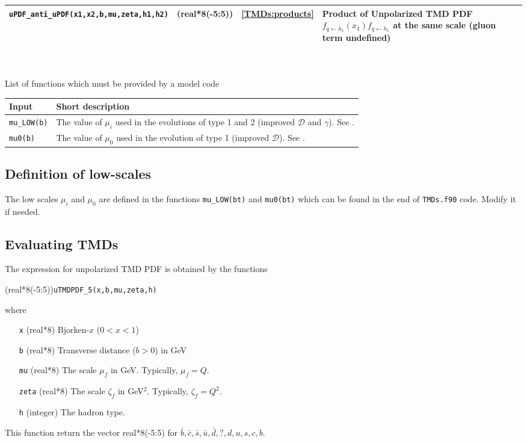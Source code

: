 \documentclass[prd,nofootinbib,eqsecnum,final]{revtex4}
\newcommand{\ot}{\leftarrow}
\renewcommand{\(}{\left(}
\renewcommand{\)}{\right)}
\renewcommand{\[}{\left[}
\renewcommand{\]}{\right]}
\begin{document}
\begin{center}
\begin{tabular}{||l|c|c|p{8cm}||}
\\\hline
\texttt{uPDF{\_}anti{\_}uPDF(x1,x2,b,mu,zeta,h1,h2)} & (real*8(-5:5)) &\ref{TMDs:products} &  Product of Unpolarized TMD PDF $f_{q\ot h_1}(x_1)f_{q\ot h_1}$ at the same scale (gluon term undefined)
\\
\hline\hline
\end{tabular}
\\
~
\\
List of functions which must be provided by a model code
\\
\begin{tabular}{||l|l||}
\hline\hline
Input &  Short description
\\\hline
\texttt{mu{\_}LOW(b)} & The value of $\mu_i$ used in the evolutions of type 1 and 2 (improved $\mathcal{D}$ and $\gamma$). See \cite{Scimemi:2018xaf}.
\\\hline
\texttt{mu0(b)}& The value of $\mu_0$ used in the evolution of type 1 (improved $\mathcal{D}$). See \cite{Scimemi:2018xaf}.
\\
\hline\hline
\end{tabular}
\end{center}

\subsection{Definition of low-scales}
\label{TMDs:mus}

The low scales $\mu_i$ and $\mu_0$ are defined in the functions \texttt{mu{\_}LOW(bt)} and \texttt{mu0(bt)} which can be found in the end of \texttt{TMDs.f90} code. Modify it if needed.



\subsection{Evaluating TMDs}
\label{TMDs:TMDs}

The expression for unpolarized TMD PDF is obtained by the functions

(real*8(-5:5))\texttt{uTMDPDF{\_}5(x,b,mu,zeta,h)}

where 
\begin{itemize}
\item [\texttt{x}] (real*8) Bjorken-$x$ ($0<x<1$)
\item [\texttt{b}] (real*8) Transverse distance ($b>0$) in GeV
\item [\texttt{mu}] (real*8) The scale $\mu_f$ in GeV. Typically, $\mu_f=Q$.
\item [\texttt{zeta}] (real*8) The scale $\zeta_f$ in GeV$^2$. Typically, $\zeta_f=Q^2$.
\item [\texttt{h}] (integer) The hadron type.
\end{itemize}
This function return the vector real*8(-5:5) for $\bar b, \bar c, \bar s,\bar u,\bar d ,?,d,u,s, c, b$.
\end{document}

